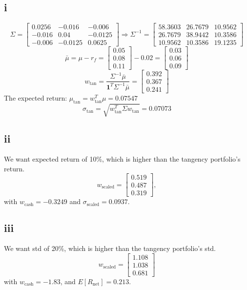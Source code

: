 \documentclass{article}
\begin{document}
\subsection*{i}
$$\displaystyle \Sigma = \left[\begin{matrix}0.0256 & -0.016 & -0.006\\-0.016 & 0.04 & -0.0125\\-0.006 & -0.0125 & 0.0625\end{matrix}\right] \Rightarrow \Sigma ^{-1} = \displaystyle \left[\begin{matrix}58.3603 & 26.7679 & 10.9562\\26.7679 & 38.9442 & 10.3586\\10.9562 & 10.3586 & 19.1235\end{matrix}\right]$$
$$\displaystyle \bar\mu = \mu - r_f = \displaystyle \left[\begin{matrix}0.05\\0.08\\0.11\end{matrix}\right] - 0.02 = \left[\begin{matrix}0.03\\0.06\\0.09\end{matrix}\right]$$
$$\displaystyle w_\text{tan} = \frac{\Sigma^{-1} \bar\mu}{\mathbf{1}^T \Sigma^{-1} \bar\mu} = \left[\begin{matrix}0.392\\0.367\\0.241\end{matrix}\right]$$
The expected return: $\mu_{\text{tan}} = w_{\text{tan}}^T \mu = 0.07547$
$$\sigma_{\text{tan}} = \sqrt{w_{\text{tan}}^T \Sigma w_{\text{tan}}} = 0.07073$$

\subsection*{ii}
We want expected return of 10\%, which is higher than the tangency portfolio's return.
$$\displaystyle w_\text{scaled} = \left[\begin{matrix}0.519\\0.487\\0.319\end{matrix}\right],$$
with $w_\text{cash} = -0.3249$ and $\sigma_\text{scaled} = 0.0937$.
\subsection*{iii}
We want std of 20\%, which is higher than the tangency portfolio's std.
$$\displaystyle w_\text{scaled} =\displaystyle \left[\begin{matrix}1.108\\1.038\\0.681\end{matrix}\right]$$
with $w_\text{cash} =-1.83$, and $E[R_{\text{net}}] = 0.213$.
\end{document}
